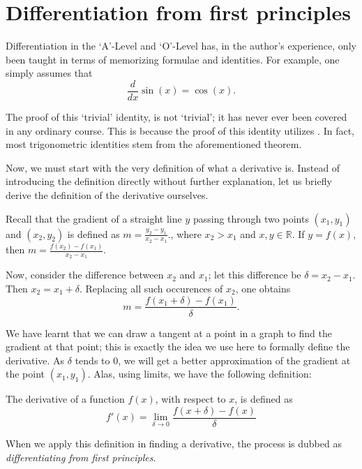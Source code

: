 \section{Differentiation from first principles}
Differentiation in the `A'-Level and `O'-Level has, in the author's experience, only been taught in terms of
memorizing formulae and identities. For example, one simply assumes that \[\frac{d}{dx}\sin(x) = \cos(x).\]

The proof of this `trivial' identity, is not `trivial'; it has never ever been covered in any
ordinary course. This is because the proof of this identity utilizes .
In fact, most trigonometric identities stem from the aforementioned theorem.

Now, we must start with the very definition of what a
derivative is. Instead of introducing the definition directly without further explanation, let us
briefly derive the definition of the derivative ourselves.

Recall that the gradient of a straight line $y$ passing through two points $(x_1, y_1)$ and $(x_2, y_2)$ is
defined as $m = \frac{y_2 - y_1}{x_2 - x_1}.$, where $x_2 > x_1$ and $x,y \in \mathbb{R}$.
If $y = f(x)$, then $m = \frac{f(x_2) - f(x_1)}{x_2 - x_1}.$

Now, consider the difference between $x_2$ and $x_1$; let this difference be
$\delta = x_2 - x_1$. Then $x_2 = x_1 + \delta$. Replacing all such occurences of $x_2$, one obtains
\[m = \frac{f(x_1 + \delta) - f(x_1)}{\delta}.\]

We have learnt that we can draw a tangent at a point in a graph to find the gradient at that point; this is exactly
the idea we use here to formally define the derivative. As $\delta$ tends to $0$, we will get a better approximation
of the gradient at the point $(x_1, y_1)$. Alas, using limits, we have the following definition:

\begin{definition}
    The derivative of a function $f(x)$, with respect to $x$, is defined as
    \[f'(x) = \lim_{\delta \to 0} \frac{f(x + \delta) - f(x)}{\delta}\]
\end{definition}

When we apply this definition in finding a derivative, the process is dubbed as \textit{differentiating
from first principles}.

